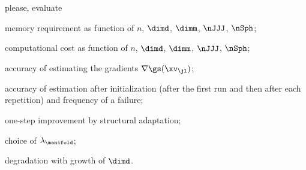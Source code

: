{\color{blue} please, evaluate
\begin{mylist}

	\item 
	memory requirement as function of \( n \), \( \dimd \), \( \dimm \), \( \nJJJ \), \( \nSph \);
	\item
	computational cost as function of \( n \), \( \dimd \), \( \dimm \), \( \nJJJ \), \( \nSph \);
	\item
	accuracy of estimating the gradients \( \nabla \gs(\xv_{\jl}) \);
	\item
	accuracy of estimation after initialization (after the first run and then after each repetition)
	and frequency of a failure;
	\item
	one-step improvement by structural adaptation;
	\item
	choice of \( \lambda_{\manifold} \);
	\item
	degradation with growth of \( \dimd \).
\end{mylist}

}

